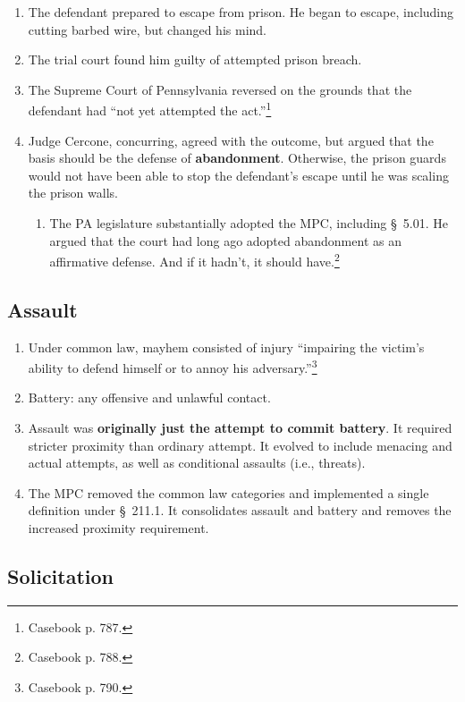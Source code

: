\begin{enumerate}
    \item The defendant prepared to escape from prison. He began to escape, 
    including cutting barbed wire, but changed his mind.
    \item The trial court found him guilty of attempted prison breach.
    \item The Supreme Court of Pennsylvania reversed on the grounds that the 
    defendant had ``not yet attempted the act.''\footnote{Casebook p. 787.}
    \item Judge Cercone, concurring, agreed with the outcome, but argued that 
    the basis should be the defense of \textbf{abandonment}. Otherwise, the 
    prison guards would not have been able to stop the defendant's escape 
    until he was scaling the prison walls.
    \begin{enumerate}
        \item The PA legislature substantially adopted the MPC, including \S\ 
        5.01. He argued that the court had long ago adopted abandonment as an 
        affirmative defense. And if it hadn't, it should 
        have.\footnote{Casebook p. 788.}
    \end{enumerate}
\end{enumerate}

\subsection{Assault}

\begin{enumerate}
    \item Under common law, mayhem consisted of injury ``impairing the 
    victim's ability to defend himself or to annoy his 
    adversary.''\footnote{Casebook p. 790.}
    \item Battery: any offensive and unlawful contact.
    \item Assault was \textbf{originally just the attempt to commit battery}. 
    It required stricter proximity than ordinary attempt. It evolved to 
    include menacing and actual attempts, as well as conditional assaults 
    (i.e., threats).
    \item The MPC removed the common law categories and implemented a single 
    definition under \S\ 211.1. It consolidates assault and battery and 
    removes the increased proximity requirement.
\end{enumerate}

\subsection{Solicitation}

